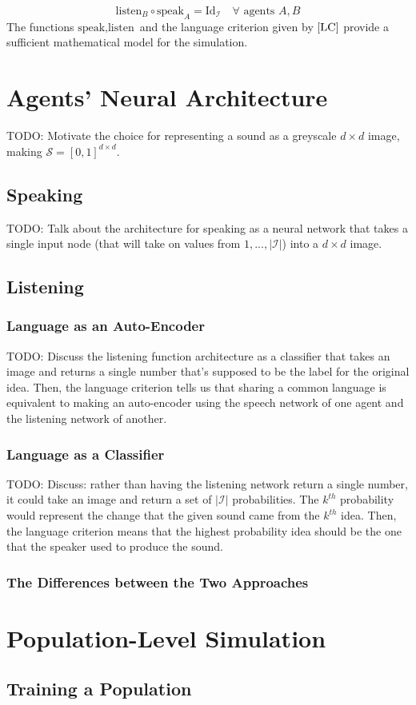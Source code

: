 \documentclass{article}
\newcommand{\ideas}{\mathcal{I}}
\newcommand{\sounds}{\mathcal{S}}
\newcommand{\speak}{\text{speak}}
\newcommand{\listen}{\text{listen}}
\begin{document}
\begin{equation}\label{LC}
\listen_{B} \circ \speak_{A} = \text{Id}_\ideas \hspace{1em}\forall\text{ agents } A, B
\end{equation}
The functions $\speak, \listen$ and the language criterion given by $\eqref{LC}$ provide a sufficient mathematical model for the simulation. 

\section{Agents' Neural Architecture}
TODO: Motivate the choice for representing a sound as a greyscale $d\times d$ image, making $\sounds = [0,1]^{d\times d}$. 

\subsection{Speaking}
TODO: Talk about the architecture for speaking as a neural network that takes a single input node (that will take on values from $1,...,|\ideas|$) into a $d\times d$ image. 

\subsection{Listening}

\subsubsection*{Language as an Auto-Encoder}
TODO: Discuss the listening function architecture as a classifier that takes an image and returns  a single number that's supposed to be the label for the original idea. Then, the language criterion tells us that sharing a common language is equivalent to making an auto-encoder using the speech network of one agent and the listening network of another. 

\subsubsection*{Language as a Classifier}
TODO: Discuss: rather than having the listening network return a single number, it could take an image and return a set of $|\ideas|$ probabilities. The $k^{th}$ probability  would represent the change that the given sound came from the $k^{th}$ idea. Then, the language criterion means that the highest probability idea should be the one that the speaker used to produce the sound. 

\subsubsection*{The Differences between the Two Approaches}

\section{Population-Level Simulation}
\subsection{Training a Population}
\end{document}
